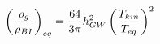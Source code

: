 \begin{equation}
\left({\rho_g \over \rho_{BI}} \right)_{eq}={64 \over {3 \pi}} h_{GW}^2 \left({T_{kin} \over T_{eq}} \right)^2
\label{graden}
\end{equation}

